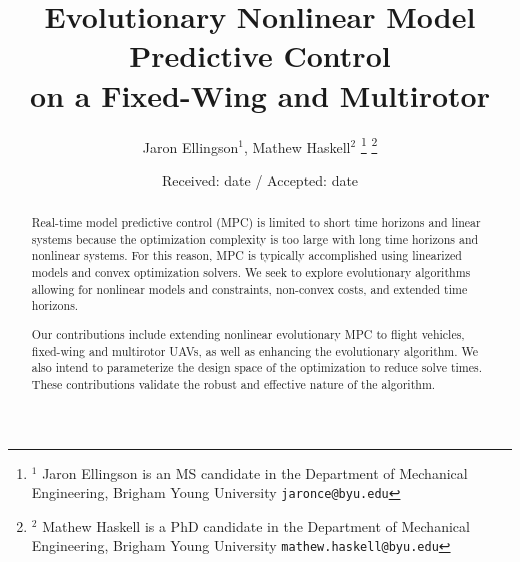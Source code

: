 \documentclass[letterpaper, 10 pt, conference]{ieeeconf}  %
\title{\LARGE \bf
	Evolutionary Nonlinear Model Predictive Control \\ on a Fixed-Wing and Multirotor
}
\author{Jaron Ellingson$^{1}$, Mathew Haskell$^{2}$%
	\thanks{$^{1}$ Jaron Ellingson is an MS candidate in the Department of Mechanical Engineering, Brigham Young University
		{\tt\small jaronce@byu.edu}}%
	\thanks{$^{2}$ Mathew Haskell is a PhD candidate in the Department of Mechanical Engineering, Brigham Young University
		{\tt\small mathew.haskell@byu.edu}}%
}
\begin{document}
	\maketitle
	\thispagestyle{empty}
	\pagestyle{empty}
	
	\date{Received: date / Accepted: date}
	
	
	\maketitle
	
	\begin{abstract}
		Real-time model predictive control (MPC) is limited to short time horizons and linear systems because the optimization complexity is too large with long time horizons and nonlinear systems. For this reason, MPC is typically accomplished using linearized models and convex optimization solvers. We seek to explore evolutionary algorithms allowing for nonlinear models and constraints, non-convex costs, and extended time horizons.
		
		Our contributions include extending nonlinear evolutionary MPC to flight vehicles, fixed-wing and multirotor UAVs, as well as enhancing the evolutionary algorithm. We also intend to parameterize the design space of the optimization to reduce solve times. These contributions validate the robust and effective nature of the algorithm.
		
	\end{abstract}
	
	
	
	
	
\end{document}
